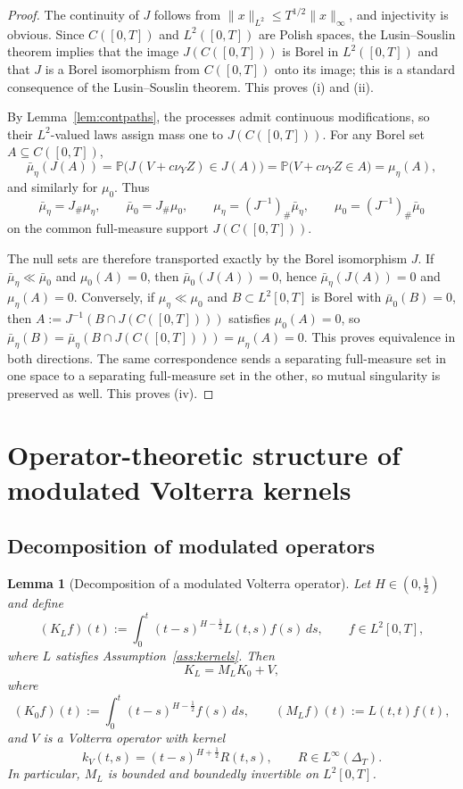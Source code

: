 \documentclass[11pt,a4paper]{amsart}
\theoremstyle{plain}
\newtheorem{lemma}[theorem]{Lemma}
\theoremstyle{definition}
\theoremstyle{remark}
\newcommand{\PP}{\mathbb{P}}
\begin{document}
\begin{proof}
The continuity of $J$ follows from $\|x\|_{L^2}\le T^{1/2}\|x\|_\infty$, and injectivity is obvious. Since $C([0,T])$ and $L^2([0,T])$ are Polish spaces, the Lusin--Souslin theorem implies that the image $J(C([0,T]))$ is Borel in $L^2([0,T])$ and that $J$ is a Borel isomorphism from $C([0,T])$ onto its image; this is a standard consequence of the Lusin--Souslin theorem. This proves (i) and (ii).

By Lemma~\ref{lem:contpaths}, the processes admit continuous modifications, so their $L^2$-valued laws assign mass one to $J(C([0,T]))$. For any Borel set $A\subseteq C([0,T])$,
\[
\bar\mu_\eta(J(A))=\PP\bigl(J(V+c\nu_Y Z)\in J(A)\bigr)=\PP\bigl(V+c\nu_Y Z\in A\bigr)=\mu_\eta(A),
\]
and similarly for $\mu_0$. Thus
\[
\bar\mu_\eta=J_\#\mu_\eta,
\qquad
\bar\mu_0=J_\#\mu_0,
\qquad
\mu_\eta=(J^{-1})_\#\bar\mu_\eta,
\qquad
\mu_0=(J^{-1})_\#\bar\mu_0
\]
on the common full-measure support $J(C([0,T]))$.

The null sets are therefore transported exactly by the Borel isomorphism $J$.  If
$\bar\mu_\eta\ll\bar\mu_0$ and $\mu_0(A)=0$, then
$\bar\mu_0(J(A))=0$, hence $\bar\mu_\eta(J(A))=0$ and $\mu_\eta(A)=0$.  Conversely, if
$\mu_\eta\ll\mu_0$ and $B\subset L^2[0,T]$ is Borel with $\bar\mu_0(B)=0$, then
$A:=J^{-1}(B\cap J(C([0,T])))$ satisfies $\mu_0(A)=0$, so
$\bar\mu_\eta(B)=\bar\mu_\eta(B\cap J(C([0,T])))=\mu_\eta(A)=0$.
This proves equivalence in both directions.  The same correspondence sends a separating full-measure set in one space to a separating full-measure set in the other, so mutual singularity is preserved as well. This proves (iv).
\end{proof}

\section{Operator-theoretic structure of modulated Volterra kernels}\label{sec:operators}

\subsection{Decomposition of modulated operators}

\begin{lemma}[Decomposition of a modulated Volterra operator]\label{lem:decomp}
Let $H\in(0,\tfrac12)$ and define
\[
(K_Lf)(t):=\int_0^t (t-s)^{H-\frac12}L(t,s)f(s)\,ds,
\qquad f\in L^2[0,T],
\]
where $L$ satisfies Assumption~\ref{ass:kernels}. Then
\[
K_L=M_LK_0+V,
\]
where
\[
(K_0f)(t):=\int_0^t (t-s)^{H-\frac12}f(s)\,ds,
\qquad
(M_Lf)(t):=L(t,t)f(t),
\]
and $V$ is a Volterra operator with kernel
\[
k_V(t,s)=(t-s)^{H+\frac12}R(t,s),
\qquad R\in L^\infty(\Delta_T).
\]
In particular, $M_L$ is bounded and boundedly invertible on $L^2[0,T]$.
\end{lemma}
\end{document}
